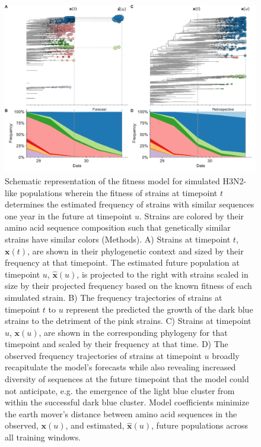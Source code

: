 \begin{figure}[htb]
  \begin{center}
  \includegraphics[width=\columnwidth]{figures/distance-based-fitness-model.pdf}
  \caption{
    Schematic representation of the fitness model for simulated H3N2-like populations wherein the fitness of strains at timepoint $t$ determines the estimated frequency of strains with similar sequences one year in the future at timepoint $u$.
    Strains are colored by their amino acid sequence composition such that genetically similar strains have similar colors (Methods).
    A) Strains at timepoint $t$, $\mathbf{x}(t)$, are shown in their phylogenetic context and sized by their frequency at that timepoint.
    The estimated future population at timepoint $u$, $\mathbf{\hat{x}}(u)$, is projected to the right with strains scaled in size by their projected frequency based on the known fitness of each simulated strain.
    B) The frequency trajectories of strains at timepoint $t$ to $u$ represent the predicted the growth of the dark blue strains to the detriment of the pink strains.
    C) Strains at timepoint $u$, $\mathbf{x}(u)$, are shown in the corresponding phylogeny for that timepoint and scaled by their frequency at that time.
    D) The observed frequency trajectories of strains at timepoint $u$ broadly recapitulate the model's forecasts while also revealing increased diversity of sequences at the future timepoint that the model could not anticipate, e.g. the emergence of the light blue cluster from within the successful dark blue cluster.
    Model coefficients minimize the earth mover's distance between amino acid sequences in the observed, $\mathbf{x}(u)$,  and estimated, $\mathbf{\hat{x}}(u)$, future populations across all training windows.
  }
  \label{fig:model}
  \end{center}
\end{figure}

